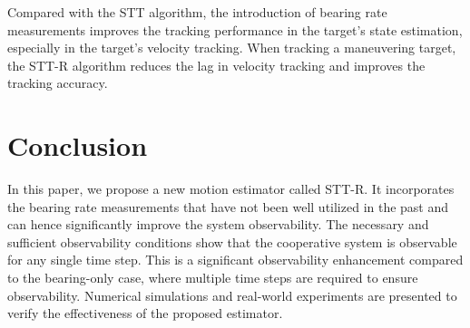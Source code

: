 \documentclass[letterpaper, 10 pt, conference]{ieeeconf}  %
\begin{document}
Compared with the STT algorithm, the introduction of bearing rate measurements improves the tracking performance in the target's state estimation, especially in the target's velocity tracking. When tracking a maneuvering target, the STT-R algorithm reduces the lag in velocity tracking and improves the tracking accuracy.

\section{Conclusion}\label{sec_conclusion}

In this paper, we propose a new motion estimator called STT-R. It incorporates the bearing rate measurements that have not been well utilized in the past and can hence significantly improve the system observability. The necessary and sufficient observability conditions show that the cooperative system is observable for any single time step. This is a significant observability enhancement compared to the bearing-only case, where multiple time steps are required to ensure observability. Numerical simulations and real-world experiments are presented to verify the effectiveness of the proposed estimator.



\end{document}
